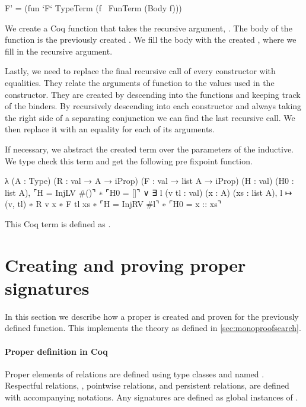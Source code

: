 \documentclass[thesis.tex]{subfiles}
\begin{document}
\begin{elpicode}
  F' = (fun `F` TypeTerm (f \ FunTerm (Body f)))
\end{elpicode}
We create a Coq function that takes the recursive argument, . The body of the function is the previously created . We fill the body with the created , where we fill in the recursive argument.

Lastly, we need to replace the final recursive call of every constructor with equalities. They relate the arguments of function to the values used in the constructor. They are created by descending into the functions and keeping track of the binders. By recursively descending into each constructor and always taking the right side of a separating conjunction we can find the last recursive call. We then replace it with an equality for each of its arguments.

If necessary, we abstract the created term over the parameters of the inductive. We type check this term and get the following pre fixpoint function.
\begin{coqcode}
  λ (A : Type) (R : val → A → iProp) 
    (F : val → list A → iProp) (H : val) (H0 : list A),
      ⌜H = InjLV #()⌝ ∗ ⌜H0 = []⌝
    ∨ ∃ l (v tl : val) (x : A) (xs : list A), 
        l ↦ (v, tl) ∗ R v x ∗ F tl xs ∗ 
        ⌜H = InjRV #l⌝ ∗ ⌜H0 = x :: xs⌝
\end{coqcode}
This Coq term is defined as .

\section{Creating and proving proper signatures}\label{sec:constrsig}
In this section we describe how a proper is created and proven for the previously defined function. This implements the theory as defined in \cref{sec:monoproofsearch}.

\paragraph{Proper definition in Coq}
Proper elements of relations are defined using type classes and named . Respectful relations, , pointwise relations,  and persistent relations,  are defined with accompanying notations. Any signatures are defined as global instances of .
\end{document}
